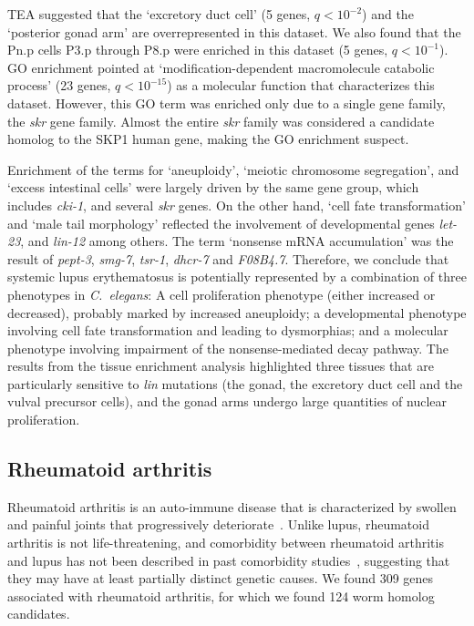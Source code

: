 \documentclass[10pt,letterpaper,twocolumn]{article}
\newcommand{\cel}{\emph{C.~elegans}}
\newcommand{\harthritis}{309}
\newcommand{\warthritis}{124}
\newcommand{\qval}[1]{\ensuremath{q<10^{-#1}}}
\begin{document}
TEA suggested that the
`excretory duct cell' (5 genes, \qval{2}) and the `posterior gonad arm' are
overrepresented in this dataset. We also found that the Pn.p cells P3.p through
P8.p were enriched in this dataset (5 genes, \qval{1}). GO enrichment pointed
at `modification-dependent macromolecule catabolic process' (23 genes,
\qval{15}) as a molecular function that characterizes this dataset. However,
this GO term was enriched only due to a single gene family, the \emph{skr} gene
family. Almost the entire \emph{skr} family was considered a candidate homolog
to the SKP1 human gene, making the GO enrichment suspect.

Enrichment of the terms for `aneuploidy', `meiotic chromosome segregation',
and `excess intestinal cells' were largely driven by the same gene group, which
includes \emph{cki-1}, and several \emph{skr} genes. On the other hand, `cell
fate transformation' and `male tail morphology' reflected the involvement of
developmental genes \emph{let-23}, and \emph{lin-12} among others. The term
`nonsense mRNA accumulation' was the result of \emph{pept-3}, \emph{smg-7},
\emph{tsr-1}, \emph{dhcr-7} and \emph{F08B4.7}. Therefore, we conclude that
systemic lupus erythematosus is potentially represented by a combination of three
phenotypes in \cel{}: A cell proliferation phenotype (either increased or
decreased), probably marked by increased
aneuploidy; a developmental phenotype involving cell fate transformation and
leading to dysmorphias; and a molecular phenotype involving impairment of the
nonsense-mediated decay pathway.
The results from the tissue enrichment analysis
highlighted three tissues that are particularly sensitive to \emph{lin} mutations
(the gonad, the excretory duct cell and the vulval precursor cells),
and the gonad arms undergo large quantities of nuclear proliferation.

\subsection*{Rheumatoid arthritis}
Rheumatoid arthritis is an auto-immune disease that is characterized by
swollen and painful joints that progressively deteriorate~\cite{Smolen2016}. Unlike lupus,
rheumatoid arthritis is not life-threatening, and comorbidity between rheumatoid
arthritis and lupus has not been described in past comorbidity studies~\cite{Dougados2013},
suggesting that they may have at least
partially distinct genetic causes. We found \harthritis{} genes associated with
rheumatoid arthritis, for which we found \warthritis{} worm homolog candidates.
\end{document}
